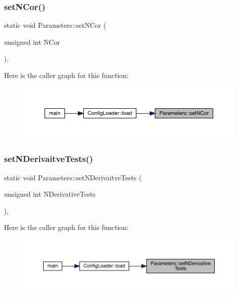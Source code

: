 \subsubsection{\texorpdfstring{setNCor()}{setNCor()}}
{\footnotesize\ttfamily static void Parameters\+::set\+N\+Cor (\begin{DoxyParamCaption}\item[{unsigned int}]{N\+Cor }\end{DoxyParamCaption})\hspace{0.3cm}{\ttfamily [inline]}, {\ttfamily [static]}}

Here is the caller graph for this function\+:\nopagebreak
\begin{figure}[H]
\begin{center}
\leavevmode
\includegraphics[width=350pt]{class_parameters_afb3ef2dca9d24511a1904bc313fd8513_icgraph}
\end{center}
\end{figure}
\mbox{\label{class_parameters_ae924eabec82bfe600eda893c6f71b00e}} 
\subsubsection{\texorpdfstring{setNDerivaitveTests()}{setNDerivaitveTests()}}
{\footnotesize\ttfamily static void Parameters\+::set\+N\+Derivaitve\+Tests (\begin{DoxyParamCaption}\item[{unsigned int}]{N\+Derivative\+Tests }\end{DoxyParamCaption})\hspace{0.3cm}{\ttfamily [inline]}, {\ttfamily [static]}}

Here is the caller graph for this function\+:\nopagebreak
\begin{figure}[H]
\begin{center}
\leavevmode
\includegraphics[width=350pt]{class_parameters_ae924eabec82bfe600eda893c6f71b00e_icgraph}
\end{center}
\end{figure}
\mbox{\label{class_parameters_a5cbf802e3e5db24cf0b8afc3f39f0830}} 
